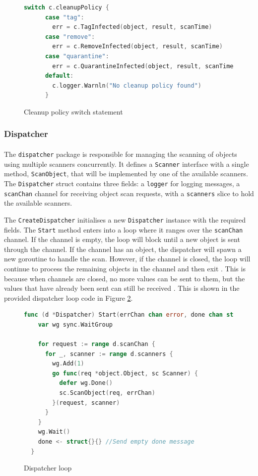 \documentclass[12pt, conference, final, a4paper, onecolumn, compsoc]{IEEEtran}
\begin{document}
\begin{figure}[H]
\begin{lstlisting}[language=Go]
      switch c.cleanupPolicy {
      case "tag":
        err = c.TagInfected(object, result, scanTime)
      case "remove":
        err = c.RemoveInfected(object, result, scanTime)
      case "quarantine":
        err = c.QuarantineInfected(object, result, scanTime)
      default:
        c.logger.Warnln("No cleanup policy found")
      }
\end{lstlisting}
  \caption{Cleanup policy switch statement}
  \label{fig:cleaner-switch}
\end{figure}

\subsubsection*{Dispatcher}
\paragraph{}

The \texttt{dispatcher} package is responsible for managing the scanning of
objects using multiple scanners concurrently. It defines a \texttt{Scanner}
interface with a single method, \texttt{ScanObject}, that will be implemented by
one of the available scanners. The \texttt{Dispatcher} struct contains three
fields: a \texttt{logger} for logging messages, a \texttt{scanChan} channel for
receiving object scan requests, with a \texttt{scanners} slice to hold the
available scanners.

The \texttt{CreateDispatcher} initialises a new \texttt{Dispatcher} instance
with the required fields. The \texttt{Start} method enters into a loop where it
ranges over the \texttt{scanChan} channel. If the channel is empty, the loop
will block until a new object is sent through the channel. If the channel has an
object, the dispatcher will spawn a new goroutine to handle the scan. However,
if the channel is closed, the loop will continue to process the remaining
objects in the channel and then exit \citep{go-channel-ranges}. This is because
when channels are closed, no more values can be sent to them, but the values
that have already been sent can still be received \citep{go-closing-channels}.
This is shown in the provided dispatcher loop code in Figure
\ref{fig:dispatcher-loop}.

\begin{figure}[H]
\begin{lstlisting}[language=Go]
  func (d *Dispatcher) Start(errChan chan error, done chan struct{}) {
    var wg sync.WaitGroup

    for request := range d.scanChan {
      for _, scanner := range d.scanners {
        wg.Add(1)
        go func(req *object.Object, sc Scanner) {
          defer wg.Done()
          sc.ScanObject(req, errChan)
        }(request, scanner)
      }
    }
    wg.Wait()
    done <- struct{}{} //Send empty done message
  }
\end{lstlisting}
  \caption{Dispatcher loop}
  \label{fig:dispatcher-loop}
\end{figure}
\end{document}
